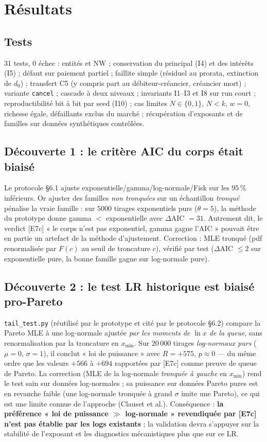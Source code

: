 \documentclass[11pt,a4paper]{article}
\newcommand{\NW}{\mathrm{NW}}
\newcommand{\code}[1]{\texttt{#1}}
\begin{document}
\section{Résultats}

\subsection{Tests}
31 tests, 0 échec : entités et $\NW$ ; conservation du principal (I4) et des
intérêts (I5) ; défaut sur paiement partiel ; faillite simple (résiduel au
prorata, extinction de $d_0$) ; transfert C5 (y compris part au
débiteur-créancier, créancier mort) ; variante \code{cancel} ; cascade à deux
niveaux ; invariants I1--I3 et I8 sur run court ; reproductibilité bit à bit
par seed (I10) ; cas limites $N \in \{0,1\}$, $N<k$, $w=0$, richesse égale,
défaillants exclus du marché ; récupération d'exposants et de familles sur
données synthétiques contrôlées.

\subsection{Découverte 1 : le critère AIC du corps était biaisé}
Le protocole §6.1 ajuste exponentielle/gamma/log-normale/Fisk sur les
95\,\% inférieurs. Or ajuster des familles \emph{non tronquées} sur un
échantillon \emph{tronqué} pénalise la vraie famille : sur $5000$ tirages
exponentiels purs ($\theta=5$), la méthode du prototype donne
gamma $<$ exponentielle avec $\Delta$AIC $= 31$. Autrement dit, le verdict
[E7c] « le corps n'est pas exponentiel, gamma gagne l'AIC » pouvait être en
partie un artefact de la méthode d'ajustement. Correction : MLE tronqué
(pdf renormalisée par $F(c)$ au seuil de troncature $c$), vérifié par test
($\Delta$AIC $\le 2$ sur exponentielle pure, la bonne famille gagne sur
log-normale pure).

\subsection{Découverte 2 : le test LR historique est biaisé pro-Pareto}
\label{sec:lr}
\code{tail\_test.py} (réutilisé par le prototype et cité par le protocole
§6.2) compare la Pareto MLE à une log-normale ajustée \emph{par les moments
de $\ln x$ de la queue}, sans renormalisation par la troncature en
$x_{\min}$. Sur $20\,000$ tirages \emph{log-normaux purs}
($\mu=0$, $\sigma=1$), il conclut « loi de puissance » avec
$R = +575$, $p \approx 0$ — du même ordre que les valeurs $+566$ à $+694$
rapportées par [E7c] comme preuve de queue de Pareto. La correction (MLE de
la log-normale \emph{tronquée à gauche} en $x_{\min}$) rend le test sain sur
données log-normales ; sa puissance sur données Pareto pures est en revanche
faible (une log-normale tronquée à grand $\sigma$ imite une Pareto), ce qui
est une limite connue de l'approche (Clauset et al.). Conséquence :
\textbf{la préférence « loi de puissance $\gg$ log-normale » revendiquée par
[E7c] n'est pas établie par les logs existants} ; la validation devra
s'appuyer sur la stabilité de l'exposant et les diagnostics mécanistiques
plus que sur ce LR.
\end{document}
